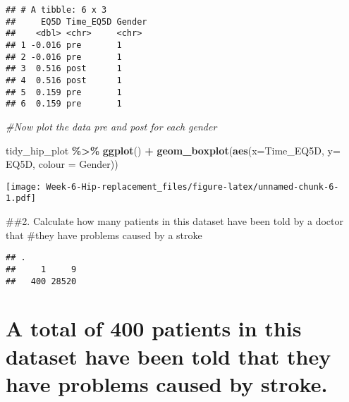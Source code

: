 \documentclass[
]{article}
\newenvironment{Shaded}{\begin{snugshade}}{\end{snugshade}}
\newcommand{\AttributeTok}[1]{\textcolor[rgb]{0.13,0.29,0.53}{#1}}
\newcommand{\CommentTok}[1]{\textcolor[rgb]{0.56,0.35,0.01}{\textit{#1}}}
\newcommand{\FunctionTok}[1]{\textcolor[rgb]{0.13,0.29,0.53}{\textbf{#1}}}
\newcommand{\NormalTok}[1]{#1}
\newcommand{\SpecialCharTok}[1]{\textcolor[rgb]{0.81,0.36,0.00}{\textbf{#1}}}
\begin{document}
\begin{verbatim}
## # A tibble: 6 x 3
##     EQ5D Time_EQ5D Gender
##    <dbl> <chr>     <chr> 
## 1 -0.016 pre       1     
## 2 -0.016 pre       1     
## 3  0.516 post      1     
## 4  0.516 post      1     
## 5  0.159 pre       1     
## 6  0.159 pre       1
\end{verbatim}

\begin{Shaded}
\begin{Highlighting}[]
\CommentTok{\#Now plot the data pre and post for each gender}

\NormalTok{tidy\_hip\_plot }\SpecialCharTok{\%\textgreater{}\%} 
  \FunctionTok{ggplot}\NormalTok{() }\SpecialCharTok{+}
  \FunctionTok{geom\_boxplot}\NormalTok{(}\FunctionTok{aes}\NormalTok{(}\AttributeTok{x=}\NormalTok{Time\_EQ5D, }\AttributeTok{y=}\NormalTok{ EQ5D, }\AttributeTok{colour =}\NormalTok{ Gender))}
\end{Highlighting}
\end{Shaded}

\texttt{[image: Week-6-Hip-replacement\_files/figure-latex/unnamed-chunk-6-1.pdf]}

\#\#2. Calculate how many patients in this dataset have been told by a
doctor that \#they have problems caused by a stroke

\begin{Shaded}
\end{Shaded}

\begin{verbatim}
## .
##     1     9 
##   400 28520
\end{verbatim}

\section{A total of 400 patients in this dataset have been told that
they have problems caused by
stroke.}\label{a-total-of-400-patients-in-this-dataset-have-been-told-that-they-have-problems-caused-by-stroke.}
\end{document}
